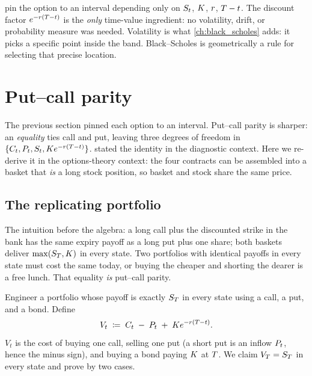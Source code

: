 \begin{intuitionbox}
 pin the option to an interval
depending only on $S_t$, $K$, $r$, $T - t$. The
discount factor $e^{-r(T - t)}$ is the \emph{only}
time-value ingredient: no volatility, drift, or probability
measure was needed. Volatility is what
\cref{ch:black_scholes} adds: it picks a specific point inside
the band. Black--Scholes is geometrically a rule for selecting
that precise location.
\end{intuitionbox}

\section{Put--call parity}
\label{sec:ch14_parity}

The previous section pinned each option to an interval.
Put--call parity is sharper: an \emph{equality} ties call and
put, leaving three degrees of freedom in
$\{C_t, P_t, S_t, K e^{-r(T-t)}\}$.
 stated the identity in the diagnostic
context. Here we re-derive it in the options-theory context:
the four contracts can be assembled into a basket that \emph{is}
a long stock position, so basket and stock share the same price.

\subsection{The replicating portfolio}
\label{sec:ch14_parity_setup}

The intuition before the algebra: a long call plus the
discounted strike in the bank has the same expiry payoff as a
long put plus one share; both baskets deliver
$\max(S_T, K)$ in every state. Two portfolios with
identical payoffs in every state must cost the same today, or
buying the cheaper and shorting the dearer is a free lunch.
That equality \emph{is} put--call parity.

Engineer a portfolio whose payoff is exactly $S_T$ in every
state using a call, a put, and a bond. Define
\begin{equation}
  V_t \;\coloneqq\; C_t \;-\; P_t \;+\; K e^{-r(T - t)}.
  \label{eq:Vt_definition}
\end{equation}
$V_t$ is the cost of buying one call, selling one put (a short
put is an inflow $P_t$, hence the minus sign), and buying a
bond paying $K$ at $T$. We claim $V_T = S_T$ in
every state and prove by two cases.

